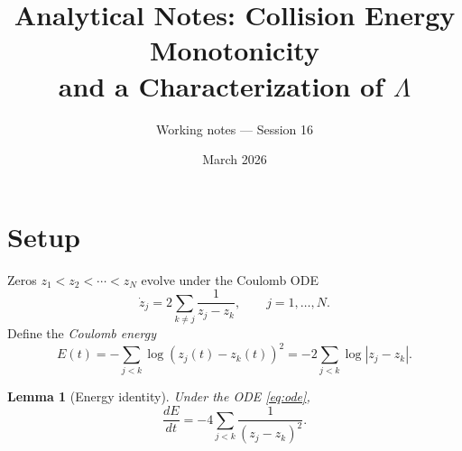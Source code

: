 \documentclass[11pt,a4paper]{article}
\title{Analytical Notes: Collision Energy Monotonicity\\
and a Characterization of $\Lambda$}
\author{Working notes --- Session 16}
\date{March 2026}
\newtheorem{lemma}{Lemma}
\begin{document}
\maketitle

\section{Setup}

Zeros $z_1 < z_2 < \cdots < z_N$ evolve under the Coulomb ODE
\begin{equation}\label{eq:ode}
  \dot{z}_j = 2\sum_{k \neq j} \frac{1}{z_j - z_k}, \qquad j = 1,\ldots,N.
\end{equation}
Define the \emph{Coulomb energy}
\begin{equation}\label{eq:energy}
  E(t) = -\sum_{j < k} \log(z_j(t) - z_k(t))^2
       = -2\sum_{j < k} \log|z_j - z_k|.
\end{equation}

\begin{lemma}[Energy identity]\label{lem:energy}
  Under the ODE \eqref{eq:ode},
  \begin{equation}\label{eq:dEdt}
    \frac{dE}{dt} = -4\sum_{j < k} \frac{1}{(z_j - z_k)^2}.
  \end{equation}
\end{lemma}
\end{document}
